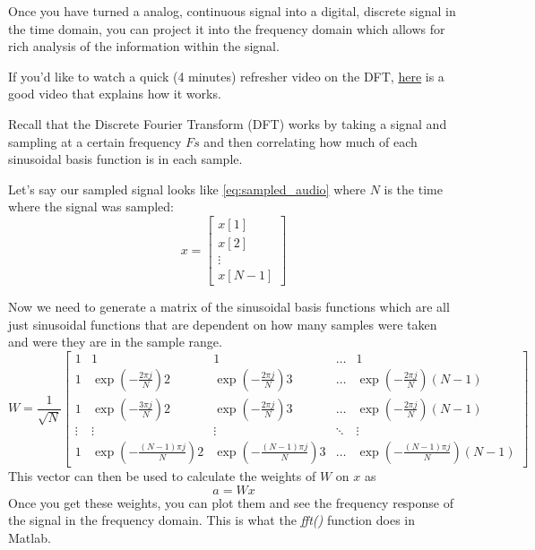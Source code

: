\documentclass{tufte-handout}
\begin{document}
Once you have turned a analog, continuous signal into a digital, discrete signal in the time domain, you can project it into the frequency domain which allows for rich analysis of the information within the signal. 

If you'd like to watch a quick (4 minutes) refresher video on the DFT, \href{https://www.youtube.com/watch?v=h6QJLx22zrE}{here} is a good video that explains how it works.

Recall that the Discrete Fourier Transform (DFT) works by taking a signal and sampling at a certain frequency $Fs$ and then correlating how much of each sinusoidal basis function is in each sample. 

Let's say our sampled signal looks like \ref{eq:sampled_audio} where $N$ is the time where the signal was sampled:
\begin{equation}\label{eq:sampled_audio}
    x=
\begin{bmatrix}
    x[1]       \\
    x[2]       \\
    \vdots \\
    x[N-1]
\end{bmatrix}
\end{equation}

Now we need to generate a matrix of the sinusoidal basis functions which are all just sinusoidal functions that are dependent on how many samples were taken and were they are in the sample range.
\begin{equation}\label{eq:basis_fns}
    W=\dfrac{1}{\sqrt{N}}
\begin{bmatrix}
    1 & 1 & 1 & \dots  & 1 \\
    1 & \exp(-\frac{2 \pi j}{N})2 & \exp(-\frac{2 \pi j}{N})3 & \dots  & \exp(-\frac{2 \pi j}{N})(N-1) \\
    1 & \exp(-\frac{3 \pi j}{N})2 & \exp(-\frac{2 \pi j}{N})3 & \dots  & \exp(-\frac{2 \pi j}{N}) (N-1) \\
    \vdots & \vdots & \vdots & \ddots & \vdots \\
    1 & \exp(-\frac{(N-1) \pi j}{N})2 & \exp(-\frac{(N-1) \pi j}{N})3 & \dots  & \exp(-\frac{(N-1) \pi j}{N}) (N-1)
\end{bmatrix}
\end{equation}
This vector can then be used to calculate the weights of $W$ on $x$ as
\begin{equation}
a = W x
\end{equation}
Once you get these weights, you can plot them and see the frequency response of the signal in the frequency domain. This is what the \textit{fft()} function does in Matlab.
\end{document}
